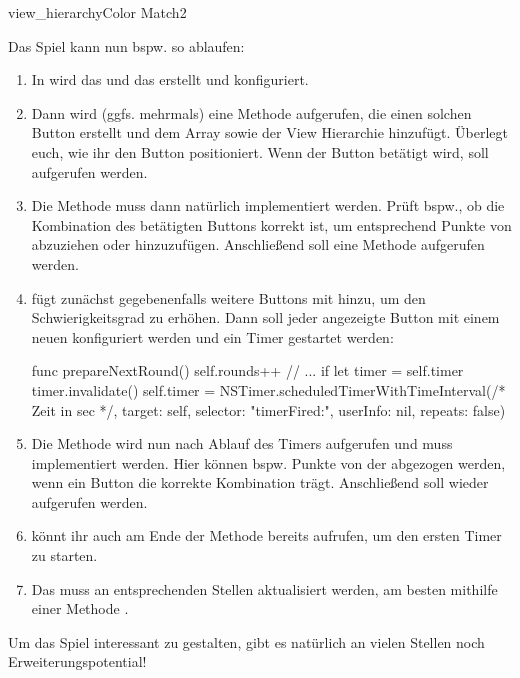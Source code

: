 \documentclass[parskip=half, final]{scrreprt}
\begin{document}
\begin{lecture}
\begin{exc}
\begin{excitem}{view_hierarchy}{Color Match}{2}
\begin{description}
	Das Spiel kann nun bspw. so ablaufen:
	
	\begin{enumerate}
		\item In  wird das  und das  erstellt und konfiguriert.
		\item Dann wird (ggfs. mehrmals) eine Methode  aufgerufen, die einen solchen Button erstellt und dem Array  sowie der View Hierarchie hinzufügt. Überlegt euch, wie ihr den Button positioniert. Wenn der Button betätigt wird, soll  aufgerufen werden.
		\item Die Methode  muss dann natürlich implementiert werden. Prüft bspw., ob die Kombination des betätigten Buttons korrekt ist, um entsprechend Punkte von  abzuziehen oder hinzuzufügen. Anschließend soll eine Methode  aufgerufen werden.
		\item {} fügt zunächst gegebenenfalls weitere Buttons mit  hinzu, um den Schwierigkeitsgrad zu erhöhen. Dann soll jeder angezeigte Button mit einem neuen  konfiguriert werden und ein Timer gestartet werden:
		\begin{swiftcode}
    func prepareNextRound() {
        self.rounds++
        // ...
        if let timer = self.timer {
            timer.invalidate()
        }
        self.timer = NSTimer.scheduledTimerWithTimeInterval(/* Zeit in sec */, target: self, selector: "timerFired:", userInfo: nil, repeats: false)
    }
		\end{swiftcode}
		\item Die Methode  wird nun nach Ablauf des Timers aufgerufen und muss implementiert werden. Hier können bspw. Punkte von der  abgezogen werden, wenn ein Button die korrekte Kombination trägt. Anschließend soll wieder  aufgerufen werden.
		\item {} könnt ihr auch am Ende der  Methode bereits aufrufen, um den ersten Timer zu starten.
		\item Das  muss an entsprechenden Stellen aktualisiert werden, am besten mithilfe einer Methode .
	\end{enumerate}
	
	Um das Spiel interessant zu gestalten, gibt es natürlich an vielen Stellen noch Erweiterungspotential!

\end{description}

\end{excitem}

\end{exc}


\end{lecture}



\end{document}
